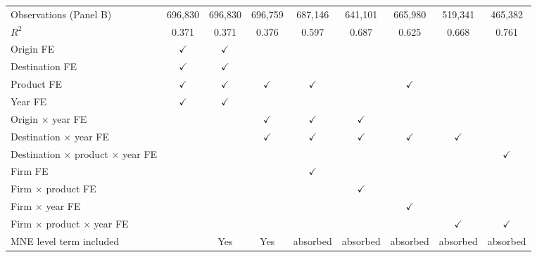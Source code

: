 \begin{tabular}{l*{8}{c}}
Observations (Panel B) & 696,830 & 696,830 & 696,759 & 687,146 & 641,101 & 665,980 & 519,341 & 465,382 \\
$R^2$ & 0.371 & 0.371 & 0.376 & 0.597 & 0.687 & 0.625 & 0.668 & 0.761 \\
\midrule
Origin FE & $\checkmark$ & $\checkmark$ &  &  &  &  &  &  \\
Destination FE & $\checkmark$ & $\checkmark$ &  &  &  &  &  &  \\
Product FE & $\checkmark$ & $\checkmark$ & $\checkmark$ & $\checkmark$ &  & $\checkmark$ &  &  \\
Year FE & $\checkmark$ & $\checkmark$ &  &  &  &  &  &  \\
Origin $\times$ year FE &  &  & $\checkmark$ & $\checkmark$ & $\checkmark$ &  &  &  \\
Destination $\times$ year FE &  &  & $\checkmark$ & $\checkmark$ & $\checkmark$ & $\checkmark$ & $\checkmark$ &  \\
Destination $\times$ product $\times$ year FE &  &  &  &  &  &  &  & $\checkmark$ \\
Firm FE &  &  &  & $\checkmark$ &  &  &  &  \\
Firm $\times$ product FE &  &  &  &  & $\checkmark$ &  &  &  \\
Firm $\times$ year FE &  &  &  &  &  & $\checkmark$ &  &  \\
Firm $\times$ product $\times$ year FE &  &  &  &  &  &  & $\checkmark$ & $\checkmark$ \\
MNE level term included &  & Yes & Yes & absorbed & absorbed & absorbed & absorbed & absorbed \\
\bottomrule
\end{tabular}
